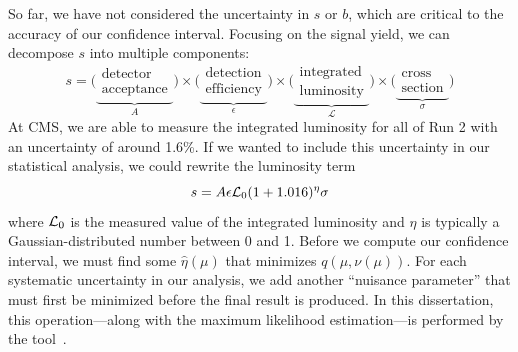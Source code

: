 So far, we have not considered the uncertainty in $s$ or $b$, which are critical to the accuracy of our confidence interval. 
Focusing on the signal yield, we can decompose $s$ into multiple components:
\begin{equation}
    s = \big(\underbrace{\substack{\text{detector} \\ \text{acceptance}}}_A\big)
        \times\big(\underbrace{\substack{\text{detection} \\ \text{efficiency}}}_\epsilon\big)
        \times\big(\underbrace{\substack{\text{integrated} \\ \text{luminosity}}}_\mathcal{L}\big)
        \times\big(\underbrace{\substack{\text{cross} \\ \text{section}}}_\sigma\big)
\end{equation}
At CMS, we are able to measure the integrated luminosity for all of Run 2 with an uncertainty of around 1.6\%. 
If we wanted to include this uncertainty in our statistical analysis, we could rewrite the luminosity term \Lumi
\begin{equation}
    s = A\epsilon\mathcal{L}_0(1 + 1.016)^\eta\sigma
\end{equation}
where $\mathcal{L}_0$ is the measured value of the integrated luminosity and $\eta$ is typically a Gaussian-distributed number between 0 and 1. 
Before we compute our confidence interval, we must find some $\hat{\eta}(\mu)$ that minimizes $q(\mu, \nu(\mu))$. 
For each systematic uncertainty in our analysis, we add another ``nuisance parameter'' that must first be minimized before the final result is produced. 
In this dissertation, this operation---along with the maximum likelihood estimation---is performed by the \COMBINE tool~\cite{CombinePaper}. 
